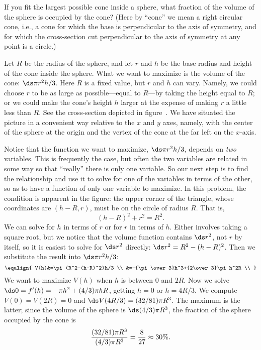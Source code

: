 \begin{example}
If you fit the largest possible cone inside a sphere, what fraction of the
volume of the sphere is occupied by the cone?  (Here by ``cone'' we mean a
right circular cone, i.e., a cone for which the base is perpendicular to
the axis of symmetry, and for which the cross-section cut perpendicular to
the axis of symmetry at any point is a circle.)


Let $R$ be the radius of the sphere, and let $r$ and $h$ be the base radius
and height of the cone inside the sphere.  What we want to maximize is the
volume of the cone: $\ds \pi r^2h/3$.  Here $R$ is a fixed value, but
$r$ and $h$ can vary.  Namely, we could choose $r$ to be as large as
possible---equal to $R$---by taking the height equal to $R$; or we
could make the cone's height $h$ larger at the expense of making $r$ a
little less than $R$.  See the cross-section depicted in
figure~. We
have situated the picture in a convenient way relative to the $x$ and
$y$ axes, namely, with the center of the sphere at the origin and the
vertex of the cone at the far left on the $x$-axis.

Notice that the function we want to maximize, $\ds \pi r^2h/3$,
depends on {\it two\/} variables.  This is frequently the case, but
often the two variables are related in some way so that ``really''
there is only one variable. So our next step is to
find the relationship and use it to solve for one of the variables in
terms of the other, so as to have a function of only one variable to
maximize.  In this problem, the condition is apparent in the figure:
the upper corner of the triangle, whose coordinates are $(h-R,r)$,
must be on the circle of radius $R$.  That is,
$$
      (h-R)^2+r^2=R^2.
$$ 
We can solve for $h$ in terms of $r$ or for $r$ in terms of $h$.
Either involves taking a square root, but we notice that the volume
function contains $\ds r^2$, not $r$ by itself, so it is easiest to solve
for $\ds r^2$ directly: $\ds r^2=R^2-(h-R)^2$.
Then we substitute the result into $\ds \pi r^2h/3$:
$$
\eqalign{ V(h)&=\pi(R^2-(h-R)^2)h/3 \\
&=-{\pi\over3}h^3+{2\over3}\pi h^2R \\ 
}$$ 
We want to maximize $V(h)$ when $h$ is between 0 and $2R$.  Now we
solve $\ds 0=f'(h)=-\pi h^2+(4/3)\pi h R$, getting $h=0$ or $h=4R/3$. 
We compute $V(0)=V(2R)=0$ and $\ds V(4R/3)=(32/81)\pi R^3$. The maximum is
the latter; since the volume of the sphere is $\ds (4/3)\pi R^3$, the
fraction of the sphere occupied by the cone is 
$${(32/81)\pi R^3\over (4/3)\pi R^3}={8\over 27}\approx 30\%.$$
\end{example}

